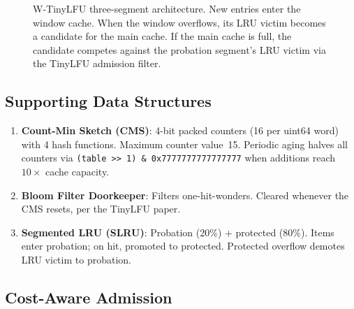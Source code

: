\documentclass[11pt,a4paper]{article}
\begin{document}
\begin{figure}[H]
{%
}%
\caption{W-TinyLFU three-segment architecture.  New entries enter the window cache.
When the window overflows, its LRU victim becomes a candidate for the main cache.
If the main cache is full, the candidate competes against the probation segment's LRU victim via the TinyLFU admission filter.}
\label{fig:arch}
\end{figure}

\subsection{Supporting Data Structures}

\begin{enumerate}
  \item \textbf{Count-Min Sketch (CMS)}: 4-bit packed counters (16 per uint64 word) with 4 hash functions.
  Maximum counter value~15.
  Periodic aging halves all counters via \texttt{(table >> 1) \& 0x7777777777777777} when additions reach $10\times$ cache capacity.

  \item \textbf{Bloom Filter Doorkeeper}: Filters one-hit-wonders.
  Cleared whenever the CMS resets, per the TinyLFU paper.

  \item \textbf{Segmented LRU (SLRU)}: Probation (20\%) + protected (80\%).
  Items enter probation; on hit, promoted to protected.
  Protected overflow demotes LRU victim to probation.
\end{enumerate}

\subsection{Cost-Aware Admission}
\end{document}
